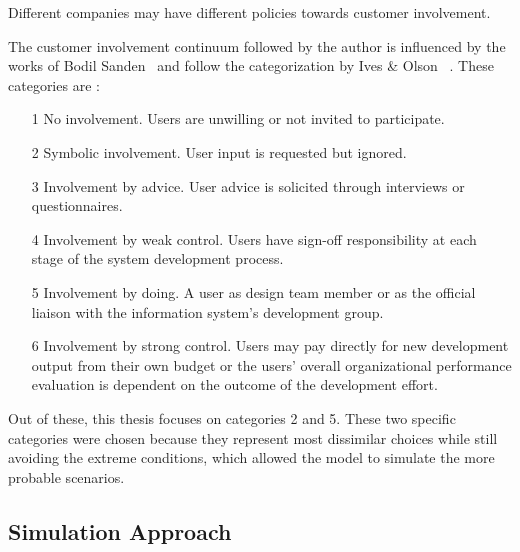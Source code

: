 Different companies may have different policies towards customer involvement. 

The customer involvement continuum followed by the author is influenced by the works of Bodil Sanden~\cite{bodil} and follow the categorization by Ives \& Olson ~\cite{1984}.
These categories are :

\begin{enumerate}

\item[1] No involvement. Users are unwilling or not invited to participate.
\item[2] Symbolic involvement. User input is requested but ignored. 
\item[3] Involvement by advice. User advice is solicited through interviews
or questionnaires.
\item[4]  Involvement by weak control. Users have sign-off responsibility at
each stage of the system development process. 
\item[5] Involvement by doing. A user as design team member or as the
official liaison with the information system’s development group. 
\item[6] Involvement by strong control. Users may pay directly for new
development output from their own budget or the users’ overall
organizational performance evaluation is dependent on the
outcome of the development effort. 
\end{enumerate}

Out of these, this thesis focuses on categories 2 and 5.
These two specific categories were chosen because they represent most dissimilar choices while still avoiding the extreme conditions, which allowed the model to simulate the more probable scenarios.

\subsection{Simulation Approach}

